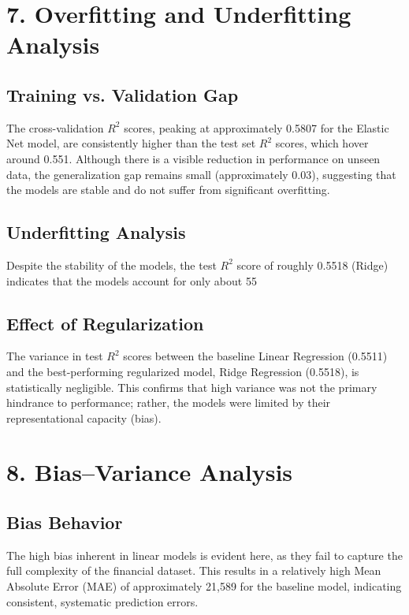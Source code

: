 \documentclass[11pt]{article}
\begin{document}
\section*{7. Overfitting and Underfitting Analysis}

\subsection*{Training vs. Validation Gap} The cross-validation $R^2$ scores, peaking at approximately 0.5807 for the Elastic Net model, are consistently higher than the test set $R^2$ scores, which hover around 0.551. Although there is a visible reduction in performance on unseen data, the generalization gap remains small (approximately 0.03), suggesting that the models are stable and do not suffer from significant overfitting.

\subsection*{Underfitting Analysis} Despite the stability of the models, the test $R^2$ score of roughly 0.5518 (Ridge) indicates that the models account for only about 55%

\subsection*{Effect of Regularization} The variance in test $R^2$ scores between the baseline Linear Regression (0.5511) and the best-performing regularized model, Ridge Regression (0.5518), is statistically negligible. This confirms that high variance was not the primary hindrance to performance; rather, the models were limited by their representational capacity (bias).

\section*{8. Bias--Variance Analysis}

\subsection*{Bias Behavior} The high bias inherent in linear models is evident here, as they fail to capture the full complexity of the financial dataset. This results in a relatively high Mean Absolute Error (MAE) of approximately 21,589 for the baseline model, indicating consistent, systematic prediction errors.
\end{document}
